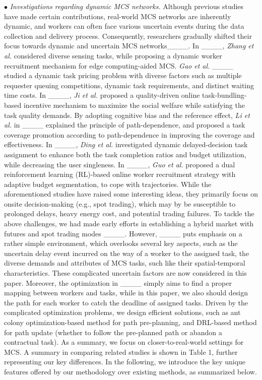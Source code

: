 \noindent
$\bullet$ \textit{Investigations regarding dynamic MCS networks.} Although previous studies have made certain contributions, real-world MCS networks are inherently dynamic, and workers can often face various uncertain events during the data collection and delivery process. Consequently, researchers gradually shifted their focus towards dynamic and uncertain MCS networks____. 
In ____, \textit{Zhang et al.} considered diverse sensing tasks, while proposing a dynamic worker recruitment mechanism for edge computing-aided MCS. 
\textit{Gao et al.} ____ studied a dynamic task pricing problem with diverse factors such as multiple requester queuing competitions, dynamic task requirements, and distinct waiting time costs.
In ____, \textit{Ji et al.} proposed a quality-driven online task-bundling-based incentive mechanism to maximize the social welfare while satisfying the task quality demands.
By adopting cognitive bias and the reference effect, \textit{Li et al.} in ____ explained the principle of path-dependence, and proposed a task coverage promotion according to path-dependence in improving the coverage and effectiveness.
In ____, \textit{Ding et al.} investigated dynamic delayed-decision task assignment to enhance both the task completion ratios and budget utilization, while decreasing the user singleness.
In ____, \textit{Guo et al.} proposed a dual reinforcement learning (RL)-based online worker recruitment strategy with adaptive budget segmentation, to cope with trajectories.
While the aforementioned studies have raised some interesting ideas, they primarily focus on onsite decision-making (e.g., spot trading), which may by be susceptible to prolonged delays, heavy energy cost, and potential trading failures. To tackle the above challenges, we had made early efforts in establishing a hybrid market with futures and spot trading modes ____. However, ____ puts emphasis on a rather simple environment, which overlooks several key aspects, such as the uncertain delay event incurred on the way of a worker to the assigned task, the diverse demands and attributes of MCS tasks, such like their spatial-temporal characteristics. These complicated uncertain factors are now considered in this paper.
Moreover, the optimization in ____ simply aims to find a proper mapping between workers and tasks, while in this paper, we also should design the path for each worker to catch the deadline of assigned tasks. Driven by the complicated optimization problems, we design efficient solutions, such as ant colony optimization-based method for path pre-planning, and DRL-based method for path update (whether to follow the pre-planned path or abandon a contractual task). As a summary, we focus on closer-to-real-world settings for MCS. A summary in comparing related studies is shown in Table 1, further representing our key differences. In the following, we introduce the key unique features offered by our methodology over existing methods, as summarized below.
 
